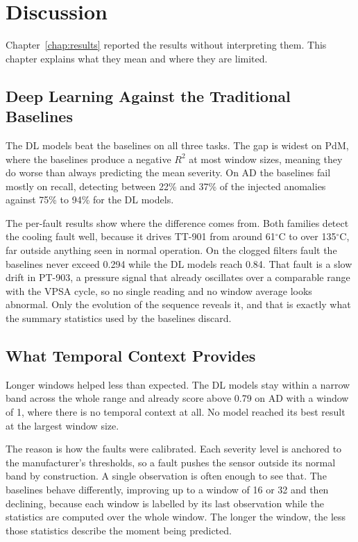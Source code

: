 
\chapter{Discussion} \label{chap:discussion}

Chapter~\ref{chap:results} reported the results without interpreting them. This chapter explains what they
mean and where they are limited.

\section{Deep Learning Against the Traditional Baselines} \label{sec:disc_baselines}

The DL models beat the baselines on all three tasks. The gap is widest on PdM, where the baselines produce
a negative $R^2$ at most window sizes, meaning they do worse than always predicting the mean severity. On
AD the baselines fail mostly on recall, detecting between 22\% and 37\% of the injected anomalies against
75\% to 94\% for the DL models.

The per-fault results show where the difference comes from. Both families detect the cooling fault well,
because it drives TT-901 from around 61$^\circ$C to over 135$^\circ$C, far outside anything seen in normal
operation. On the clogged filters fault the baselines never exceed 0.294 while the DL models reach 0.84.
That fault is a slow drift in PT-903, a pressure signal that already oscillates over a comparable range
with the VPSA cycle, so no single reading and no window average looks abnormal. Only the evolution of the
sequence reveals it, and that is exactly what the summary statistics used by the baselines discard.

\section{What Temporal Context Provides} \label{sec:disc_window}

Longer windows helped less than expected. The DL models stay within a narrow band across the whole range
and already score above 0.79 on AD with a window of 1, where there is no temporal context at all. No model
reached its best result at the largest window size.

The reason is how the faults were calibrated. Each severity level is anchored to the manufacturer's
thresholds, so a fault pushes the sensor outside its normal band by construction. A single observation is
often enough to see that. The baselines behave differently, improving up to a window of 16 or 32 and then
declining, because each window is labelled by its last observation while the statistics are computed over
the whole window. The longer the window, the less those statistics describe the moment being predicted.


